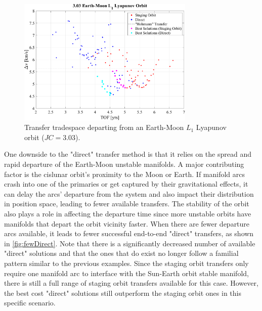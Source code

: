 \begin{figure}[ht]
    \centering
    \includegraphics[width=0.75\textwidth]{figures/TradeSpace_L1Lyapunov_3_03.pdf}
    \caption{Transfer tradespace departing from an Earth-Moon $L_{1}$ Lyapunov orbit ($JC=3.03$).}
    \label{fig:lowBoth}
\end{figure}

One downside to the "direct" transfer method is that it relies on the spread and rapid departure of
the Earth-Moon unstable manifolds. A major contributing factor is the cislunar orbit's proximity to
the Moon or Earth. If manifold arcs crash into one of the primaries or get captured by their
gravitational effects, it can delay the arcs' departure from the system and also impact their
distribution in position space, leading to fewer available transfers. The stability of the orbit
also plays a role in affecting the departure time since more unstable orbits have manifolds that
depart the orbit vicinity faster. When there are fewer departure arcs available, it leads to fewer
successful end-to-end "direct" transfers, as shown in \cref{fig:fewDirect}. Note that there is a
significantly decreased number of available "direct" solutions and that the ones that do exist no
longer follow a familial pattern similar to the previous examples. Since the staging orbit
transfers only require one manifold arc to interface with the Sun-Earth orbit stable manifold,
there is still a full range of staging orbit transfers available for this case. However, the best
cost "direct" solutions still outperform the staging orbit ones in this specific scenario.

